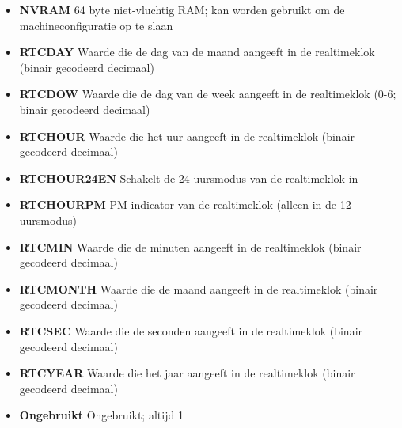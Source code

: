 \begin{itemize}
\item{\bf{NVRAM}} 64 byte niet-vluchtig RAM; kan worden gebruikt om de machineconfiguratie op te slaan
\item{\bf{RTCDAY}} Waarde die de dag van de maand aangeeft in de realtimeklok (binair gecodeerd decimaal)
\item{\bf{RTCDOW}} Waarde die de dag van de week aangeeft in de realtimeklok (0-6; binair gecodeerd decimaal)
\item{\bf{RTCHOUR}} Waarde die het uur aangeeft in de realtimeklok (binair gecodeerd decimaal)
\item{\bf{RTCHOUR24EN}} Schakelt de 24-uursmodus van de realtimeklok in
\item{\bf{RTCHOURPM}} PM-indicator van de realtimeklok (alleen in de 12-uursmodus)
\item{\bf{RTCMIN}} Waarde die de minuten aangeeft in de realtimeklok (binair gecodeerd decimaal)
\item{\bf{RTCMONTH}} Waarde die de maand aangeeft in de realtimeklok (binair gecodeerd decimaal)
\item{\bf{RTCSEC}} Waarde die de seconden aangeeft in de realtimeklok (binair gecodeerd decimaal)
\item{\bf{RTCYEAR}} Waarde die het jaar aangeeft in de realtimeklok (binair gecodeerd decimaal)
\item{\bf{Ongebruikt}} Ongebruikt; altijd 1
\end{itemize}
